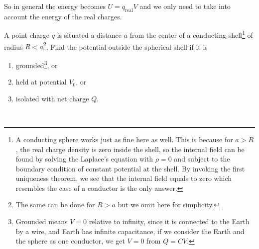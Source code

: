 \documentclass[english,a4paper,12pt]{report}
\begin{document}
So in general the energy becomes \(U = q_{\text{real} } V \) and we only need to take into account the energy of the real charges. 

{A point charge \(q\) is situated a distance \(a\) from the center of a conducting shell\footnote{A conducting sphere works just as fine here as well. This is because for \(a > R\), the real charge density is zero inside the shell, so the internal field can be found by solving the Laplace's equation with \(\rho = 0\) and subject to the boundary condition of constant potential at the shell. By invoking the first uniqueness theorem, we see that the internal field equals to zero which resembles the case of a conductor is the only answer.} of radius \(R < a\)\footnote{The same can be done for \(R > a\) but we omit here for simplicity.}. Find the potential outside the spherical shell if it is  
\newline 
\begin{enumerate}[itemsep=10pt] 
    \item grounded\footnote{Grounded means \(V = 0 \) relative to infinity, since it is connected to the Earth by a wire, and Earth has infinite capacitance, if we consider the Earth and the sphere as one conductor, we get \(V = 0\) from \(Q = CV\).}, or
    \item held at potential \(V_0\), or
    \item isolated with net charge \(Q\).
\end{enumerate}~}
\end{document}
